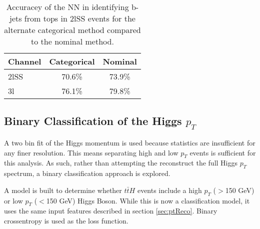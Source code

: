 \begin{table}[H]
  \centering
  \caption{Accuracey of the NN in identifying b-jets from tops in 2lSS events for the alternate categorical method compared to the nominal method.}
  \begin{tabular}{l|c|c}                                                                                                     
  \hline\hline
  Channel & Categorical & Nominal \\                                                                              
  \hline                                                                                                                  
  2lSS & 70.6\% & 73.9\% \\
  3l & 76.1\% & 79.8\% \\
  \hline                                                                                                                 
  \end{tabular}                                                                                                           
  \label{tab:topMatchCatApx}
\end{table}

\subsection{Binary Classification of the Higgs $p_T$}
\label{subsec:binPtApx}
                                                                                                                     
A two bin fit of the Higgs momentum is used because statistics are insufficient for any finer resolution. This means separating high and low $p_T$ events is sufficient for this analysis. As such, rather than attempting the reconstruct the full Higgs $p_T$ spectrum, a binary classification approach is explored.

A model is built to determine whether $t\bar{t}H$ events include a high $p_T$ ($>$150 GeV) or low $p_T$ ($<$150 GeV) Higgs Boson. While this is now a classification model, it uses the same input features described in section \ref{sec:ptReco}. Binary crossentropy is used as the loss function.

\begin{figure}[H]                                                                                                           
  \\
  \caption{}
  \label{fig:bin2lSSroc}                                                                          
\end{figure}

